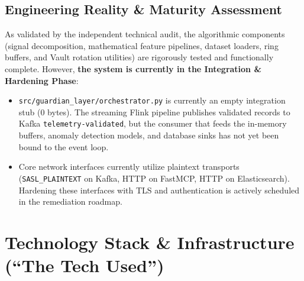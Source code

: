 \documentclass[10pt,a4paper]{report}
\begin{document}
\section{Engineering Reality \& Maturity Assessment}
As validated by the independent technical audit, the algorithmic components (signal decomposition, mathematical feature pipelines, dataset loaders, ring buffers, and Vault rotation utilities) are rigorously tested and functionally complete. However, \textbf{the system is currently in the Integration \& Hardening Phase}:
\begin{itemize}[leftmargin=*]
  \item \texttt{src/guardian\_layer/orchestrator.py} is currently an empty integration stub (0 bytes). The streaming Flink pipeline publishes validated records to Kafka \texttt{telemetry-validated}, but the consumer that feeds the in-memory buffers, anomaly detection models, and database sinks has not yet been bound to the event loop.
  \item Core network interfaces currently utilize plaintext transports (\texttt{SASL\_PLAINTEXT} on Kafka, HTTP on FastMCP, HTTP on Elasticsearch). Hardening these interfaces with TLS and authentication is actively scheduled in the remediation roadmap.
\end{itemize}

\chapter{Technology Stack \& Infrastructure (``The Tech Used'')}
\end{document}
